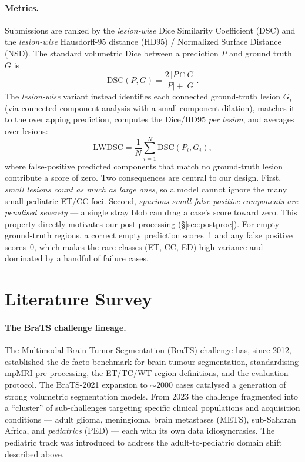 \documentclass[11pt,a4paper]{article}
\begin{document}
\paragraph{Metrics.} Submissions are ranked by the \emph{lesion-wise} Dice
Similarity Coefficient (DSC) and the \emph{lesion-wise} Hausdorff-95 distance
(HD95) / Normalized Surface Distance (NSD). The standard volumetric Dice between a
prediction $P$ and ground truth $G$ is
\[
\mathrm{DSC}(P,G)=\frac{2\,|P\cap G|}{|P|+|G|}.
\]
The \emph{lesion-wise} variant instead identifies each connected ground-truth lesion
$G_i$ (via connected-component analysis with a small-component dilation), matches it
to the overlapping prediction, computes the Dice/HD95 \emph{per lesion}, and averages
over lesions:
\[
\mathrm{LWDSC}=\frac{1}{N}\sum_{i=1}^{N}\mathrm{DSC}(P_i,G_i),
\]
where false-positive predicted components that match no ground-truth lesion
contribute a score of zero. Two consequences are central to our design.
First, \emph{small lesions count as much as large ones}, so a model cannot ignore
the many small pediatric ET/CC foci. Second, \emph{spurious small false-positive
components are penalised severely} --- a single stray blob can drag a case's score
toward zero. This property directly motivates our post-processing
(\S\ref{sec:postproc}). For empty ground-truth regions, a correct empty prediction
scores~1 and any false positive scores~0, which makes the rare classes (ET, CC, ED)
high-variance and dominated by a handful of failure cases.

\section{Literature Survey}
\label{sec:lit}
\paragraph{The BraTS challenge lineage.}
The Multimodal Brain Tumor Segmentation (BraTS) challenge has, since 2012,
established the de-facto benchmark for brain-tumour segmentation, standardising
mpMRI pre-processing, the ET/TC/WT region definitions, and the evaluation protocol.
The BraTS-2021 expansion to $\sim\!2000$ cases catalysed a generation of strong
volumetric segmentation models. From 2023 the challenge fragmented into a
``cluster'' of sub-challenges targeting specific clinical populations and
acquisition conditions --- adult glioma, meningioma, brain metastases (METS),
sub-Saharan Africa, and \emph{pediatrics} (PED) --- each with its own data
idiosyncrasies. The pediatric track was introduced to address the adult-to-pediatric
domain shift described above.
\end{document}
